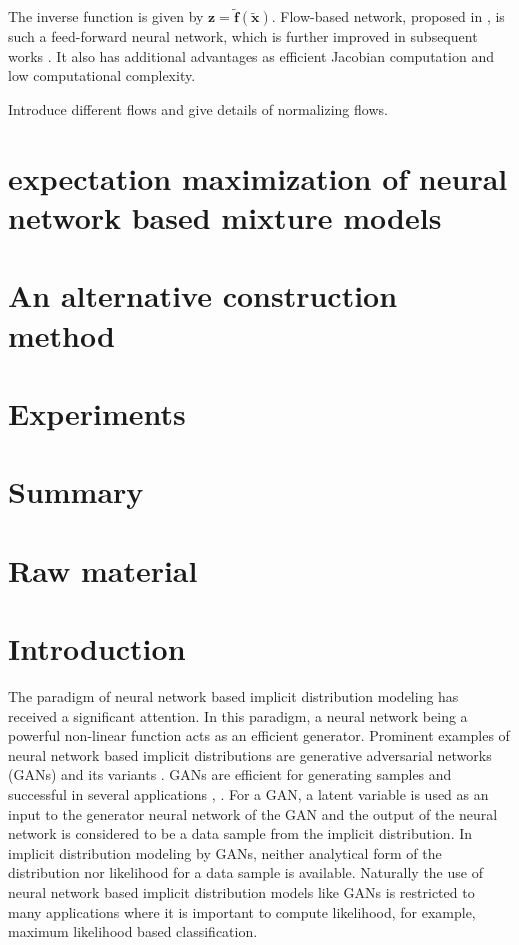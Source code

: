  The inverse function is given by $\bm{z}=\tilde{\bm{f}}(\tilde{\bm{x}})$. Flow-based network, proposed in \cite{DBLP:journals/corr/DinhKB14}, is such a feed-forward neural network, which is further improved in subsequent works \cite{2016arXiv160508803D, 2018arXiv180703039K}. It also has additional advantages as efficient Jacobian computation and low computational complexity. %



Introduce different flows and give details of normalizing flows.


\section{expectation maximization of neural network based mixture models}

\section{An alternative construction method}

\section{Experiments}


\section{Summary}

\section{Raw material}
\section{Introduction}

The paradigm of neural network based implicit distribution
modeling has received a significant attention. In this paradigm, a neural network being a powerful non-linear function acts as an efficient generator. Prominent examples of neural network based implicit distributions are generative adversarial networks (GANs) \cite{NIPS2014_5423} and its
variants \cite{NIPS2016_6125,
  2018arXiv180508318Z, salimans2018improving}. GANs are efficient for generating samples and successful in several applications \cite{ledig2017photo}, \cite{NIPS2016_6125}. For a GAN, a latent variable is used as
an input to the generator neural network of the GAN and the output of the
neural network is considered to be a data sample from the implicit
distribution.  In implicit distribution modeling by GANs, neither
analytical form of the distribution nor likelihood for a data sample
is available. Naturally the use of neural network based implicit distribution models like GANs is restricted to many applications where it is important to compute likelihood, for example, maximum likelihood based classification.

